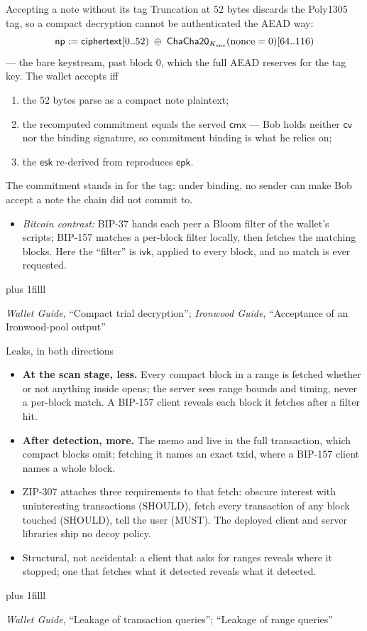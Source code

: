 \documentclass[aspectratio=169,11pt]{beamer}
\newcommand{\cmx}{\ensuremath{\mathsf{cmx}}}
\newcommand{\cvsym}{\ensuremath{\mathsf{cv}}}
\newcommand{\ivk}{\ensuremath{\mathsf{ivk}}}
\newcommand{\esk}{\ensuremath{\mathsf{esk}}}
\newcommand{\epk}{\ensuremath{\mathsf{epk}}}
\newcommand{\src}[1]{\par\vskip0pt plus 1filll
  {\fontsize{6}{7.2}\selectfont\color{arbdim}\raggedright #1\par}}
\begin{document}
\begin{frame}{Accepting a note without its tag}
Truncation at $52$ bytes discards the Poly1305 tag, so a compact
decryption cannot be authenticated the AEAD way:
\[
\mathsf{np} := \mathsf{ciphertext}[0..52) \;\oplus\;
  \mathsf{ChaCha20}_{K_{\mathrm{enc}}}(\mathrm{nonce} = 0)[64..116)
\]
--- the bare keystream, past block $0$, which the full AEAD reserves for
the tag key. The wallet accepts iff
\begin{enumerate}
  \item the $52$ bytes parse as a compact note plaintext;
  \item the recomputed commitment equals the served \cmx{} --- Bob holds
    neither \cvsym{} nor the binding signature, so commitment binding is
    what he relies on;
  \item the \esk{} re-derived from \Frseed{} reproduces \epk.
\end{enumerate}
The commitment stands in for the tag: under binding, no sender can make
Bob accept a note the chain did not commit to.
\begin{itemize}
  \item \emph{Bitcoin contrast:} BIP-37 hands each peer a Bloom filter of
    the wallet's scripts; BIP-157 matches a per-block filter locally,
    then fetches the matching blocks. Here the ``filter'' is \ivk,
    applied to every block, and no match is ever requested.
\end{itemize}
\src{\emph{Wallet Guide}, ``Compact trial decryption''; \emph{Ironwood
  Guide}, ``Acceptance of an Ironwood-pool output''}
\end{frame}

\begin{frame}{Leaks, in both directions}
\begin{itemize}
  \item \textbf{At the scan stage, less.} Every compact block in a range
    is fetched whether or not anything inside opens; the server sees
    range bounds and timing, never a per-block match. A BIP-157 client
    reveals each block it fetches after a filter hit.
  \item \textbf{After detection, more.} The memo and \Fout{} live in the
    full transaction, which compact blocks omit; fetching it names an
    exact txid, where a BIP-157 client names a whole block.
  \item ZIP-307 attaches three requirements to that fetch: obscure
    interest with uninteresting transactions (SHOULD), fetch every
    transaction of any block touched (SHOULD), tell the user (MUST). The
    deployed client and server libraries ship no decoy policy.
  \item Structural, not accidental: a client that asks for ranges reveals
    where it stopped; one that fetches what it detected reveals what it
    detected.
\end{itemize}
\src{\emph{Wallet Guide}, ``Leakage of transaction queries''; ``Leakage of range
  queries''}
\end{frame}
\end{document}
